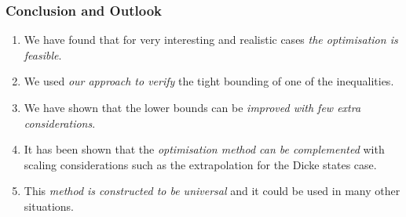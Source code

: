\documentclass{beamer}
\begin{document}
	\begin{frame}
		\frametitle{Conclusion and Outlook}
		\begin{enumerate}
			\item<1-> We have found that for very interesting and realistic cases \emph{\color{blue}the optimisation is feasible}.
			\item<2-> We used \emph{\color{blue}our approach to verify} the tight bounding of one of the inequalities.
			\item<3-> We have shown that the lower bounds can be \emph{\color{blue}improved with few extra considerations}.
			\item<4-> It has been shown that the \emph{\color{blue}optimisation method can be complemented} with scaling considerations such as the extrapolation for the Dicke states case.
			\item<5-> This \emph{\color{blue}method is constructed to be universal} and it could be used in many other situations.
		\end{enumerate}

	\end{frame}


\end{document}

